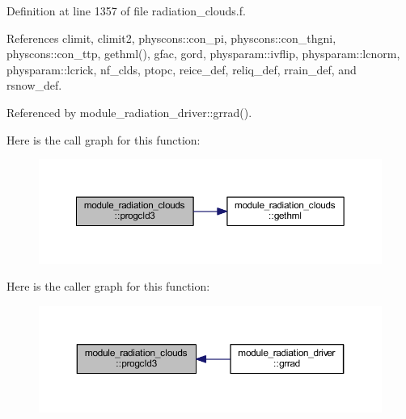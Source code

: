 Definition at line 1357 of file radiation\+\_\+clouds.\+f.



References climit, climit2, physcons\+::con\+\_\+pi, physcons\+::con\+\_\+thgni, physcons\+::con\+\_\+ttp, gethml(), gfac, gord, physparam\+::ivflip, physparam\+::lcnorm, physparam\+::lcrick, nf\+\_\+clds, ptopc, reice\+\_\+def, reliq\+\_\+def, rrain\+\_\+def, and rsnow\+\_\+def.



Referenced by module\+\_\+radiation\+\_\+driver\+::grrad().



Here is the call graph for this function\+:\nopagebreak
\begin{figure}[H]
\begin{center}
\leavevmode
\includegraphics[width=350pt]{namespacemodule__radiation__clouds_a1953118ed22c3b6f8d94ef231b47a08b_cgraph}
\end{center}
\end{figure}




Here is the caller graph for this function\+:\nopagebreak
\begin{figure}[H]
\begin{center}
\leavevmode
\includegraphics[width=350pt]{namespacemodule__radiation__clouds_a1953118ed22c3b6f8d94ef231b47a08b_icgraph}
\end{center}
\end{figure}


